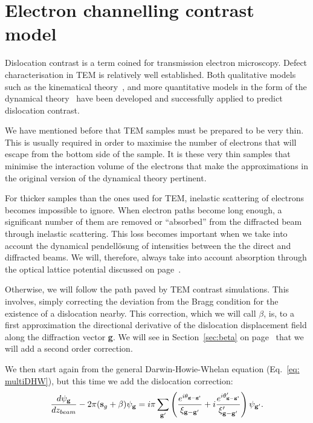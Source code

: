  \section{Electron channelling contrast model}

Dislocation contrast is a term coined for transmission electron microscopy. Defect characterisation in TEM is relatively well established. Both qualitative models such as the kinematical theory~\cite{Hirsch60}, and more quantitative models in the form of the dynamical theory~\cite{Howie61,Clarke71,Spencer72} have been developed and successfully applied to predict dislocation contrast.

We have mentioned before that TEM samples must be prepared to be very thin. This is usually required in order to maximise the number of electrons that will escape from the bottom side of the sample. It is these very thin samples that minimise the interaction volume of the electrons that make the approximations in the original version of the dynamical theory pertinent. 

For thicker samples than the ones used for TEM, inelastic scattering of electrons becomes impossible to ignore. When electron paths become long enough, a significant number of them are removed or ``absorbed'' from the diffracted beam through inelastic scattering. This loss becomes important when we take into account the dynamical pendell{\"o}sung of intensities between the the direct and diffracted beams. We will, therefore, always take into account absorption through the optical lattice potential discussed on page~\pageref{sec:absorbtion}.


Otherwise, we will follow the path paved by TEM contrast simulations. This involves, simply correcting the deviation from the Bragg condition for the existence of a dislocation nearby. This correction, which we will call $\beta$, is, to a first approximation the directional derivative of the dislocation displacement field along the diffraction vector \textbf{g}. We will see in Section~\ref{sec:beta} on page~\pageref{sec:beta} that we will add a second order correction.  

We then start again from the general Darwin-Howie-Whelan equation (Eq.~\ref{eq: multiDHW}), but this time we add the dislocation  correction:
\begin{equation}
\label{eq: multiDHWTD}
     \frac{d \psi_\mathbf{g}}{dz_{beam}} - 2 \pi  (\vb{s}_g+ \beta) \psi_{\vb{g}} = i \pi \sum_{\vb{g}'} \left( \frac{ e^{i \theta_{\textbf{g}- \textbf{g'}}}}{\xi_{\vb{g}-\vb{g}'}} +i\frac{ e^{i \theta'_{\textbf{g}- \textbf{g'}}}}{\xi'_{\vb{g}-\vb{g}'}}\right) \psi_{\vb{g}'}.
\end{equation}


